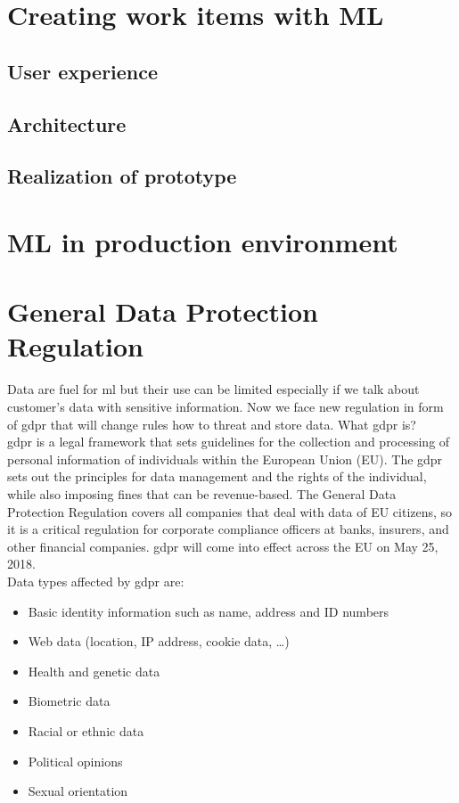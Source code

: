 \documentclass[thesis=M,english]{FITthesis}[2012/06/26]
\begin{document}
\chapter{Creating work items with ML}

\section{User experience}

\section{Architecture}

\section{Realization of prototype}

\chapter{ML in production environment}

\chapter{General Data Protection Regulation}

Data are fuel for \acrshort{ml} but their use can be limited especially if we talk about customer's data with sensitive information. Now we face new regulation in form of \acrshort{gdpr} that will change rules how to threat and store data. What \acrshort{gdpr} is?\\

\acrshort{gdpr}\cite{gdpr_info} is a legal framework that sets guidelines for the collection and processing of personal information of individuals within the European Union (EU). The \acrshort{gdpr} sets out the principles for data management and the rights of the individual, while also imposing fines that can be revenue-based. The General Data Protection Regulation covers all companies that deal with data of EU citizens, so it is a critical regulation for corporate compliance officers at banks, insurers, and other financial companies. \acrshort{gdpr} will come into effect across the EU on May 25, 2018.\\

Data types affected by \acrshort{gdpr} are:
\begin{itemize}[nosep]
\item Basic identity information such as name, address and ID numbers
\item Web data (location, IP address, cookie data, \dots)
\item Health and genetic data
\item Biometric data
\item Racial or ethnic data
\item Political opinions
\item Sexual orientation\\
\end{itemize}
\end{document}

